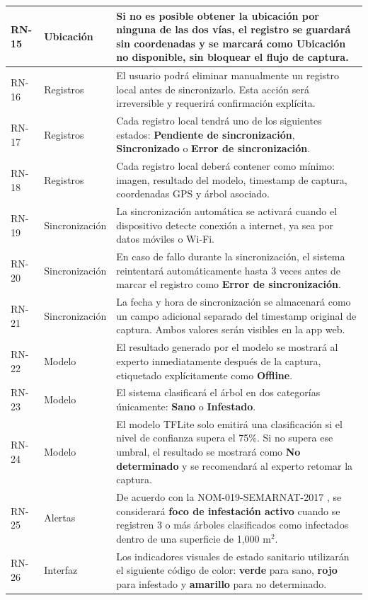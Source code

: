 \begin{longtable}{|>{\centering\arraybackslash}m{1.8cm}|>{\centering\arraybackslash}m{2.5cm}|m{9.5cm}|}
RN-15 & Ubicación & Si no es posible obtener la ubicación por ninguna de las dos vías, el registro se guardará sin coordenadas y se marcará como \textbf{Ubicación no disponible}, sin bloquear el flujo de captura. \\
\hline
RN-16 & Registros & El usuario podrá eliminar manualmente un registro local antes de sincronizarlo. Esta acción será irreversible y requerirá confirmación explícita. \\
\hline
RN-17 & Registros & Cada registro local tendrá uno de los siguientes estados: \textbf{Pendiente de sincronización}, \textbf{Sincronizado} o \textbf{Error de sincronización}. \\
\hline
RN-18 & Registros & Cada registro local deberá contener como mínimo: imagen, resultado del modelo, timestamp de captura, coordenadas GPS y árbol asociado. \\
\hline
RN-19 & Sincronización & La sincronización automática se activará cuando el dispositivo detecte conexión a internet, ya sea por datos móviles o Wi-Fi. \\
\hline
RN-20 & Sincronización & En caso de fallo durante la sincronización, el sistema reintentará automáticamente hasta 3 veces antes de marcar el registro como \textbf{Error de sincronización}. \\
\hline
RN-21 & Sincronización & La fecha y hora de sincronización se almacenará como un campo adicional separado del timestamp original de captura. Ambos valores serán visibles en la app web. \\
\hline
RN-22 & Modelo & El resultado generado por el modelo se mostrará al experto inmediatamente después de la captura, etiquetado explícitamente como \textbf{Offline}. \\
\hline
RN-23 & Modelo & El sistema clasificará el árbol en dos categorías únicamente: \textbf{Sano} o \textbf{Infestado}. \\
\hline
RN-24 & Modelo & El modelo TFLite solo emitirá una clasificación si el nivel de confianza supera el 75\%. Si no supera ese umbral, el resultado se mostrará como \textbf{No determinado} y se recomendará al experto retomar la captura. \\
\hline
RN-25 & Alertas & De acuerdo con la NOM-019-SEMARNAT-2017 \cite{nom019_semarnat_2017}, se considerará \textbf{foco de infestación activo} cuando se registren 3 o más árboles clasificados como infectados dentro de una superficie de 1{,}000 m$^2$. \\
\hline
RN-26 & Interfaz & Los indicadores visuales de estado sanitario utilizarán el siguiente código de color: \textbf{verde} para sano, \textbf{rojo} para infestado y \textbf{amarillo} para no determinado. \\

\end{longtable}
